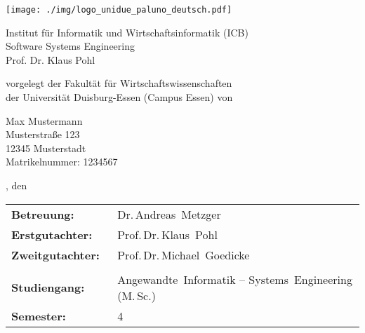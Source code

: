 \pagestyle{empty} %

\texttt{[image: ./img/logo\_unidue\_paluno\_deutsch.pdf]}

\begin{sffamily}

\begin{center}

\vspace*{0.7cm}

\normalsize{Institut für Informatik und Wirtschaftsinformatik (ICB)\\%
Software Systems Engineering\\
Prof. Dr. Klaus Pohl}


\vspace*{2.5cm}

\LARGE{\documentHeading}

\vspace*{1cm}

\large{\documentType}

\vspace*{2.5cm}

\normalsize{vorgelegt der Fakultät für Wirtschaftswissenschaften\\
der Universität Duisburg-Essen (Campus Essen) von}

\vspace*{\baselineskip}

\normalsize{
Max Mustermann \\
Musterstraße 123 \\
12345 Musterstadt \\
Matrikelnummer: 1234567
}

\vspace*{1.5cm}

\small{\documentLocation, den \documentDate}

\vspace*{1.5cm}

\normalsize{
\begin{tabular*}{\linewidth}{p{0.3\linewidth}p{0.7\linewidth}}
\textbf{Betreuung:}      & Dr.\,Andreas~Metzger\\
\textbf{Erstgutachter:}  & Prof.\,Dr.\,Klaus~Pohl\\
\textbf{Zweitgutachter:} & Prof.\,Dr.\,Michael~Goedicke\\
\\
\textbf{Studiengang:}    & Angewandte~Informatik -- Systems~Engineering (M.\,Sc.)\\
\textbf{Semester:}       & 4
\end{tabular*}
}

\end{center}

\end{sffamily}
\clearpage